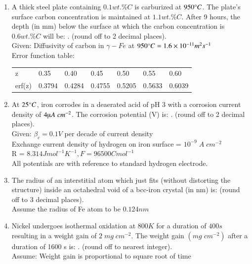 \documentclass[journal]{IEEEtran}
\theoremstyle{remark}
\begin{document}
\begin{enumerate}[resume]
\item A thick steel plate containing $0.1 wt.\% C$ is carburized at $950\degree C$. The
plate's surface carbon concentration is maintained at $1.1 wt.\% C$. After 9
hours, the depth (in mm) below the surface at which the carbon
concentration is $0.6 wt.\% C$ will be:  \underline {\hspace{2cm}}. (round off to 2 decimal places). \hfill{}\\
Given: Diffusivity of carbon in $\gamma-Fe$ at $950\degree C = 1.6\times10^{-11} m^2 s^{-1}$\\
Error function table:\\
\begin{tabular}{lllllll}
  z &0.35&0.40&0.45&0.50&0.55&0.60  \\
   erf(z)  &0.3794&0.4284&0.4755&0.5205&0.5633&0.6039 
\end{tabular}

\item At $25\degree C$, iron corrodes in a deaerated acid of pH 3 with a corrosion
current density of $4 \micro A\;cm^{-2}$. The corrosion potential (V) is:  \underline {\hspace{2cm}}. (round off to 2 decimal places). \hfill{}\\
Given: $\beta_c = 0.1 V$ per decade of current density\\
Exchange current density of hydrogen on iron surface = $10^{-9}\; A\; cm^{-2}$\\
R = $8.314 J mol^{-1} K^{-1}, F = 96500 C mol^{-1}$\\
All potentials are with reference to standard hydrogen electrode.

\item The radius of an interstitial atom which just fits (without distorting the
structure) inside an octahedral void of a bcc-iron crystal (in nm) is: \underline {\hspace{2cm}}  (round off to 3 decimal places). \\ Assume the radius of Fe atom to be $0.124 nm$ \hfill{}

\item Nickel undergoes isothermal oxidation at $800 K$ for a duration of $400 s$
resulting in a weight gain of $2 \;mg \;cm^{-2}$. The weight gain $(mg\; cm^{-2})$ after a duration of 1600 s is:  \underline {\hspace{2cm}}. (round off to nearest integer). \hfill{}\\
Assume: Weight gain is proportional to square root of time


\end{enumerate}
\end{document}
